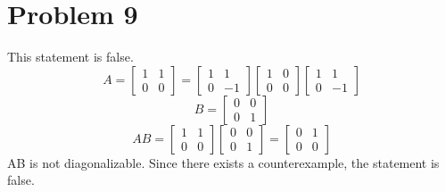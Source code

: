 \section*{Problem 9}
This statement is false.
\[
    A =
    \begin{bmatrix}
        1 & 1\\
        0 & 0
    \end{bmatrix} = 
    \begin{bmatrix}
        1 & 1\\
        0 & -1
    \end{bmatrix}
    \begin{bmatrix}
        1 & 0\\
        0 & 0
    \end{bmatrix}
    \begin{bmatrix}
        1 & 1\\
        0 & -1
    \end{bmatrix}
\]
\[
    B =
    \begin{bmatrix}
        0 & 0\\
        0 & 1
    \end{bmatrix}
\]
\[
    AB =
    \begin{bmatrix}
        1 & 1\\
        0 & 0
    \end{bmatrix}
    \begin{bmatrix}
        0 & 0\\
        0 & 1
    \end{bmatrix} =
    \begin{bmatrix}
        0 & 1\\
        0 & 0
    \end{bmatrix}
\]
AB is not diagonalizable.
Since there exists a counterexample, the statement is false.
